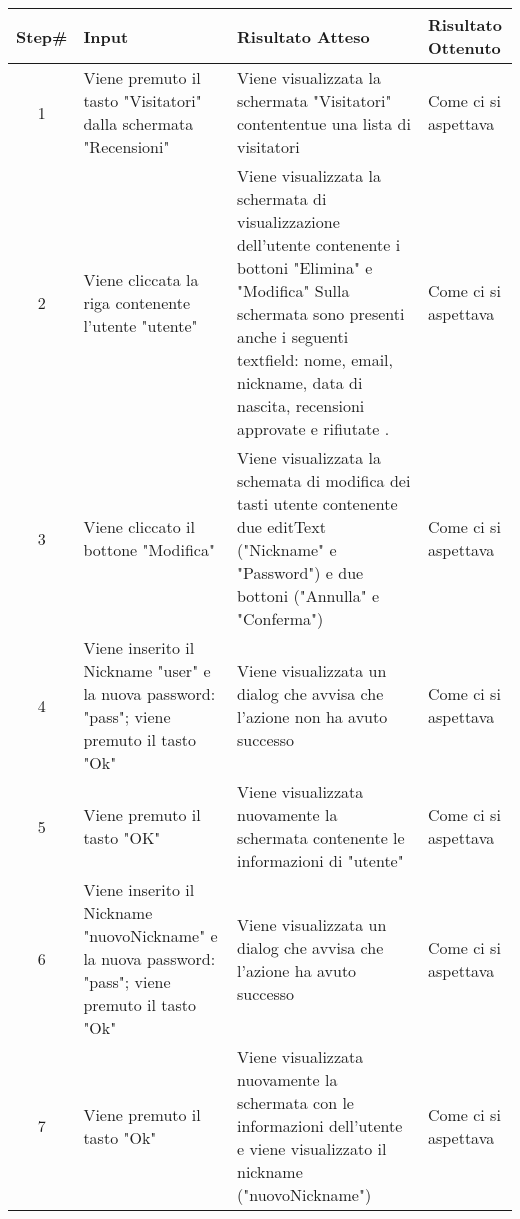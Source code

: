 \begin{table}[H]
    \footnotesize
    \begin{tabularx}{\textwidth}{|c|X|X|X|}
        \hline
        Step\# & Input & Risultato Atteso & Risultato Ottenuto \\
        \hline
         1 & Viene premuto il tasto "Visitatori" dalla schermata "Recensioni" 
         & Viene visualizzata la schermata "Visitatori" contententue una lista di visitatori
         &Come ci si aspettava \\
          \hline
        2 & Viene cliccata la riga contenente l'utente "utente"
        & Viene visualizzata la schermata di visualizzazione dell'utente contenente i bottoni "Elimina" e "Modifica"
          Sulla schermata sono presenti anche i seguenti textfield: nome, email, nickname, data di nascita, recensioni approvate e rifiutate .
        & Come ci si aspettava\\
         \hline 
        3 & Viene cliccato il bottone "Modifica"
         & Viene visualizzata la schemata di modifica dei tasti utente contenente due editText ("Nickname" e "Password") e
         due bottoni ("Annulla" e "Conferma")
         & Come ci si aspettava\\
          \hline
        4 & Viene inserito il Nickname "user" e la nuova password: "pass"; viene premuto il tasto "Ok"
         & Viene visualizzata un dialog che avvisa che l'azione non ha avuto successo
         & Come ci si aspettava\\
          \hline  
          5 & Viene premuto il tasto "OK"
          & Viene visualizzata nuovamente la schermata contenente le informazioni di "utente"
          & Come ci si aspettava\\
          \hline      
        6 & Viene inserito il Nickname "nuovoNickname" e la nuova password: "pass"; viene premuto il tasto "Ok"
         & Viene visualizzata un dialog che avvisa che l'azione ha avuto successo
         & Come ci si aspettava\\
           \hline 
           7 & Viene premuto il tasto "Ok"
           & Viene visualizzata nuovamente la schermata con le informazioni dell'utente e
           viene visualizzato il nickname ("nuovoNickname")
           & Come ci si aspettava\\
             \hline                       
    \end{tabularx}
\end{table}
    
       
